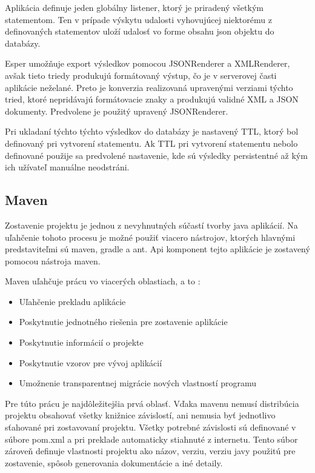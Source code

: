 		Aplikácia definuje jeden globálny listener, ktorý je priradený všetkým statementom. Ten v prípade výskytu udalosti vyhovujúcej niektorému z definovaných statementov uloží udalosť vo forme obsahu json objektu do databázy.
		
		Esper umožňuje export výsledkov pomocou JSONRenderer a XMLRenderer, avšak tieto triedy produkujú formátovaný výstup, čo je v serverovej časti aplikácie neželané. Preto je konverzia realizovaná upravenými verziami týchto tried, ktoré nepridávajú formátovacie znaky a produkujú validné XML a JSON dokumenty. Predvolene je použitý upravený JSONRenderer.
		
		Pri ukladaní týchto týchto výsledkov do databázy je nastavený TTL, ktorý bol definovaný pri vytvorení statementu. Ak TTL pri vytvorení statementu nebolo definované použije sa predvolené nastavenie, kde sú výsledky persistentné až kým ich užívateľ manuálne neodstráni.

	\subsection{Maven}
		Zostavenie projektu je jednou z nevyhnutných súčastí tvorby java aplikácií. Na uľahčenie tohoto procesu je možné použiť viacero nástrojov, ktorých hlavnými predstaviteľmi sú maven, gradle a ant. Api komponent tejto aplikácie je zostavený pomocou nástroja maven. 
		
		Maven uľahčuje prácu vo viacerých oblastiach, a to \cite{web:maven-doc}:
		\begin{itemize}
			\item Uľahčenie prekladu aplikácie
			\item Poskytnutie jednotného riešenia pre zostavenie aplikácie
			\item Poskytnutie informácií o projekte
			\item Poskytnutie vzorov pre vývoj aplikácií
			\item Umožnenie transparentnej migrácie nových vlastností programu
		\end{itemize}
		Pre túto prácu je najdôležitejšia prvá oblasť. Vďaka mavenu nemusí distribúcia projektu obsahovať všetky knižnice závislostí, ani nemusia byť jednotlivo sťahované pri zostavovaní projektu. Všetky potrebné závislosti sú definované v súbore pom.xml a pri preklade automaticky stiahnuté z internetu. Tento súbor zároveň definuje vlastnosti projektu ako názov, verziu, verziu javy použitú pre zostavenie, spôsob generovania dokumentácie a iné detaily.
		
